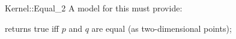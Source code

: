 \begin{ccRefFunctionObjectConcept}{Kernel::Equal_2}
A model for this must provide:


{returns true iff $p$ and $q$ are equal (as two-dimensional points);}

\end{ccRefFunctionObjectConcept}
